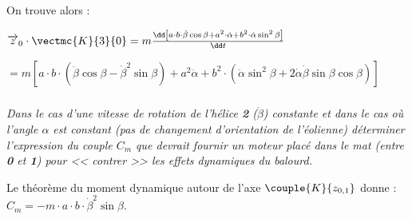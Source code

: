 \begin{multicols}{2}
\begin{corrige}
On trouve alors : 

$
\overrightarrow{z}_0\cdot \vectmc{K}{3}{0}=
m\frac{\dd\left[a\cdot b\cdot \dot{\beta}\cos\beta+a^2\cdot \dot{\alpha}+b^2\cdot \dot{\alpha}\sin^2\beta\right]}{\dd t}
$

$=m\left[a\cdot b\cdot \left(\ddot{\beta}\cos\beta-\dot{\beta}^2\sin\beta\right)+a^2\ddot{\alpha}+b^2\cdot\left(\ddot{\alpha}\sin^2\beta+2\dot{\alpha}\dot{\beta}\sin\beta\cos\beta\right)\right]
$

\end{corrige}
\else
\fi


\subparagraph{} \textit{Dans le cas d'une vitesse de rotation de l'hélice \textbf{2} ($\dot{\beta}$) constante et dans le cas où l'angle $\alpha$ est constant (pas de changement d'orientation de l'éolienne) déterminer l'expression du couple $C_m$ que devrait fournir un moteur placé dans le mat (entre \textbf{0} et \textbf{1}) pour << contrer >> les effets dynamiques du balourd.}

\ifprof
\begin{corrige}
Le théorème du moment dynamique autour de l'axe $\couple{K}{{z}_{0,1}}$ donne :
$
C_m=-m\cdot a\cdot b\cdot \dot{\beta}^2\sin\beta
$.

\end{corrige}
\else
\fi


\ifprof
\else
\end{multicols}
\fi

